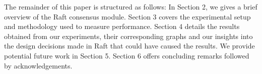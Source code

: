 The remainder of this paper is structured as follows: In Section 2, we gives a brief overview of the Raft consensus module. Section 3 covers the experimental setup and methodology used to measure performance. Section 4 details the results obtained from our experiments, their corresponding graphs and our insights into the design decisions made in Raft that could have caused the results. We provide potential future work in Section 5. Section 6 offers concluding remarks followed by acknowledgements.
